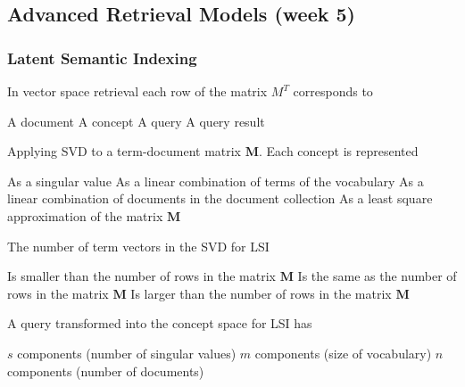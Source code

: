 \documentclass[12pt,a4paper]{exam} %
\newcommand{\mat}[1]{\ensuremath{\textbf{#1}}}
\begin{document}
\subsection{Advanced Retrieval Models (week 5)} %

\subsubsection{Latent Semantic Indexing}

\begin{questions}

\question In vector space retrieval each row of the matrix $M^T$ corresponds to
\begin{checkboxes}
\CorrectChoice A document
\choice A concept
\choice A query
\choice A query result
\end{checkboxes}

\question Applying SVD to a term-document matrix \mat{M}. Each concept is represented
\begin{checkboxes}
\choice As a singular value
\CorrectChoice As a linear combination of terms of the vocabulary
\choice As a linear combination of documents in the document collection
\choice As a least square approximation of the matrix \mat{M}
\end{checkboxes}

\question The number of term vectors in the SVD for LSI
\begin{checkboxes}
\choice Is smaller than the number of rows in the matrix \mat{M}
\CorrectChoice Is the same as the number of rows in the matrix \mat{M}
\choice Is larger than the number of rows in the matrix \mat{M}
\end{checkboxes}

\question A query transformed into the concept space for LSI has
\begin{checkboxes}
\CorrectChoice $s$ components (number of singular values)
\choice $m$ components (size of vocabulary)
\choice $n$ components (number of documents)
\end{checkboxes}
\end{questions}
\end{document}
